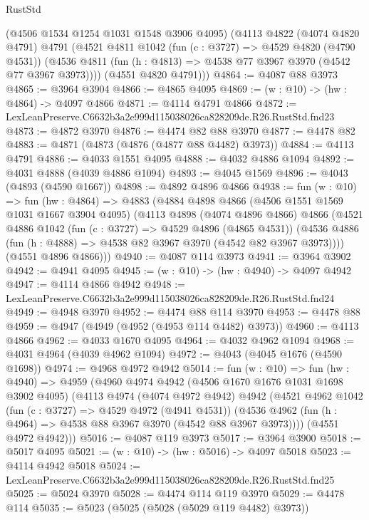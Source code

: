 \begin{lexlean}{RustStd}
\begin{coremodule}
      (@4506 @1534 @1254 @1031 @1548 @3906 @4095)
      (@4113
        @4822
        (@4074 @4820 @4791)
        @4791
        (@4521
          @4811
          @1042
          (fun (c : @3727) => @4529 @4820 (@4790 @4531))
          (@4536 @4811 (fun (h : @4813) => @4538 @77 @3967 @3970 (@4542 @77 @3967 @3973))))
        (@4551 @4820 @4791)))
@4864 := @4087 @88 @3973
@4865 := @3964 @3904
@4866 := @4865 @4095
@4869 := (w : @10) -> (hw : @4864) -> @4097 @4866
@4871 := @4114 @4791 @4866
@4872 := LexLeanPreserve.C6632b3a2e999d115038026ca828209de.R26.RustStd.fnd23
@4873 := @4872 @3970
@4876 := @4474 @82 @88 @3970
@4877 := @4478 @82
@4883 := @4871 (@4873 (@4876 (@4877 @88 @4482) @3973))
@4884 := @4113 @4791
@4886 := @4033 @1551 @4095
@4888 := @4032 @4886 @1094
@4892 := @4031 @4888 (@4039 @4886 @1094)
@4893 := @4045 @1569
@4896 := @4043 (@4893 (@4590 @1667))
@4898 := @4892 @4896 @4866
@4938 := fun (w : @10) =>
  fun (hw : @4864) =>
  @4883
    (@4884
      @4898
      @4866
      (@4506 @1551 @1569 @1031 @1667 @3904 @4095)
      (@4113
        @4898
        (@4074 @4896 @4866)
        @4866
        (@4521
          @4886
          @1042
          (fun (c : @3727) => @4529 @4896 (@4865 @4531))
          (@4536 @4886 (fun (h : @4888) => @4538 @82 @3967 @3970 (@4542 @82 @3967 @3973))))
        (@4551 @4896 @4866)))
@4940 := @4087 @114 @3973
@4941 := @3964 @3902
@4942 := @4941 @4095
@4945 := (w : @10) -> (hw : @4940) -> @4097 @4942
@4947 := @4114 @4866 @4942
@4948 := LexLeanPreserve.C6632b3a2e999d115038026ca828209de.R26.RustStd.fnd24
@4949 := @4948 @3970
@4952 := @4474 @88 @114 @3970
@4953 := @4478 @88
@4959 := @4947 (@4949 (@4952 (@4953 @114 @4482) @3973))
@4960 := @4113 @4866
@4962 := @4033 @1670 @4095
@4964 := @4032 @4962 @1094
@4968 := @4031 @4964 (@4039 @4962 @1094)
@4972 := @4043 (@4045 @1676 (@4590 @1698))
@4974 := @4968 @4972 @4942
@5014 := fun (w : @10) =>
  fun (hw : @4940) =>
  @4959
    (@4960
      @4974
      @4942
      (@4506 @1670 @1676 @1031 @1698 @3902 @4095)
      (@4113
        @4974
        (@4074 @4972 @4942)
        @4942
        (@4521
          @4962
          @1042
          (fun (c : @3727) => @4529 @4972 (@4941 @4531))
          (@4536 @4962 (fun (h : @4964) => @4538 @88 @3967 @3970 (@4542 @88 @3967 @3973))))
        (@4551 @4972 @4942)))
@5016 := @4087 @119 @3973
@5017 := @3964 @3900
@5018 := @5017 @4095
@5021 := (w : @10) -> (hw : @5016) -> @4097 @5018
@5023 := @4114 @4942 @5018
@5024 := LexLeanPreserve.C6632b3a2e999d115038026ca828209de.R26.RustStd.fnd25
@5025 := @5024 @3970
@5028 := @4474 @114 @119 @3970
@5029 := @4478 @114
@5035 := @5023 (@5025 (@5028 (@5029 @119 @4482) @3973))

\end{coremodule}
\end{lexlean}
